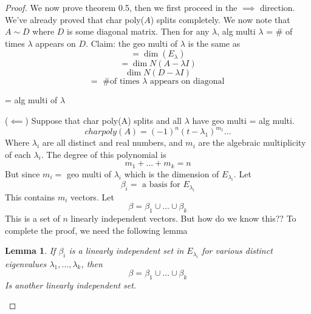 \documentclass{article}
\newtheorem{lemma}[theorem]{Lemma}
\newtheorem{one minute paper}[theorem]{One Minute Paper}
\begin{document}
\begin{proof}
    We now prove theorem 0.5, then we first proceed in the $\implies$ direction. We've already proved that char poly($A$) splits completely. We now note that $A \sim D$ where $D$ is some 
    diagonal matrix. Then for any $\lambda$, alg multi $\lambda$ = \# of times $\lambda$ appears on $D$. Claim: the geo multi of $\lambda$ is the same as 
    \begin{equation}
        = \dim(E_\lambda)
    \end{equation}
    \begin{equation}
        = \dim N(A - \lambda I)
    \end{equation}
    \begin{equation}
        \dim N(D - \lambda I)
    \end{equation}
    \begin{equation}
        = \text{ \# of times $\lambda$ appears on diagonal }
    \end{equation}
    \begin{center}
        = alg multi of $\lambda$
    \end{center}
    ($\impliedby$) Suppose that char poly(A) splits and all $\lambda$ have geo multi = alg multi. 
    \begin{equation}
        char poly(A) = (-1)^n(t - \lambda_1)^{m_1}\dots
    \end{equation}
    Where $\lambda_i$ are all distinct and real numbers, and $m_i$ are the algebraic multiplicity of each $\lambda_i$. The degree of this polynomial is 
    \begin{equation}
        m_1 + \dots + m_k = n
    \end{equation}
    But since $m_i = $ geo multi of $\lambda_i$ which is the dimension of $E_{\lambda_i}$. Let 
    \begin{equation}
        \beta_i = \text{ a basis for $E_{\lambda_i}$}
    \end{equation}
    This contains $m_i$ vectors. Let 
    \begin{equation}
        \beta = \beta_1 \cup \dots \cup \beta_k
    \end{equation}
    This is a set of $n$ linearly independent vectors. But how do we know this?? To complete the proof, we need the following lemma
    \begin{lemma}
        If $\beta_i$ is a linearly independent set in $E_{\lambda_i}$ for various distinct eigenvalues $\lambda_1, \dots, \lambda_k$, then 
        \begin{equation}
            \beta = \beta_1 \cup \dots \cup \beta_k
        \end{equation} 
        Is another linearly independent set. 
    \end{lemma}
\end{proof}
\end{document}

